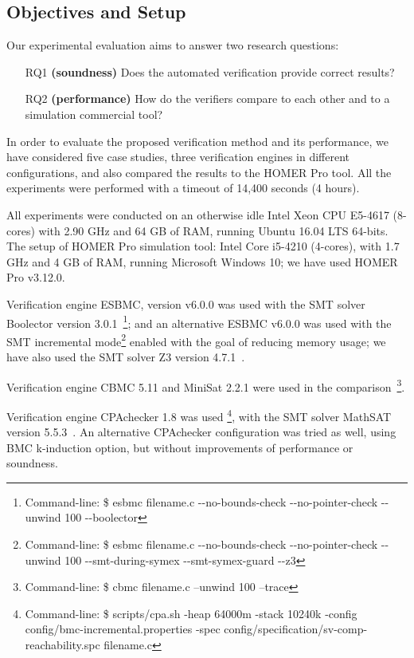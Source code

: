 \documentclass[review]{elsarticle}
\begin{document}
\subsection{Objectives and Setup}
\label{sec:setup}
Our experimental evaluation aims to answer two research questions:
%
\begin{enumerate}
\item[RQ1] \textbf{(soundness)} Does the automated verification provide correct results?
\item[RQ2] \textbf{(performance)} How do the verifiers compare to each other and to a simulation commercial tool?
\end{enumerate}

In order to evaluate the proposed verification method and its performance, we have considered five case studies, three verification engines in different configurations, and also compared the results to the HOMER Pro tool. All the experiments were performed with a timeout of 14,400 seconds (4 hours). %

All experiments were conducted on an otherwise idle Intel Xeon CPU E5-4617 (8-cores) with 2.90 GHz and 64 GB of RAM, running Ubuntu 16.04 LTS 64-bits. The setup of HOMER Pro simulation tool: Intel Core i5-4210 (4-cores), with 1.7 GHz and 4 GB of RAM, running Microsoft Windows 10; we have used HOMER Pro v3.12.0.

Verification engine ESBMC, version v6.0.0 was used with the SMT solver Boolector version 3.0.1~\cite{Brummayer}\footnote{Command-line: \$ esbmc filename.c -\phantom{}-no-bounds-check -\phantom{}-no-pointer-check -\phantom{}-unwind 100 -\phantom{}-boolector}; and an alternative ESBMC v6.0.0 was used with the SMT incremental mode\footnote{Command-line: \$ esbmc filename.c -\phantom{}-no-bounds-check -\phantom{}-no-pointer-check -\phantom{}-unwind 100 -\phantom{}-smt-during-symex -\phantom{}-smt-symex-guard -\phantom{}-z3} enabled with the goal of reducing memory usage; we have also used the SMT solver Z3 version 4.7.1~\cite{DeMoura}.

Verification engine CBMC 5.11 and MiniSat 2.2.1 were used in the comparison~\cite{Kroening}\footnote{Command-line: \$ cbmc filename.c --unwind 100 --trace}.
 
Verification engine CPAchecker 1.8 was used \footnote{Command-line: \$ scripts/cpa.sh -heap 64000m -stack 10240k -config config/bmc-incremental.properties -spec config/specification/sv-comp-reachability.spc filename.c}, with the SMT solver MathSAT version 5.5.3~\cite{mathsat5}. An alternative CPAchecker configuration was tried as well, using BMC k-induction option, but without improvements of performance or soundness.
\end{document}
